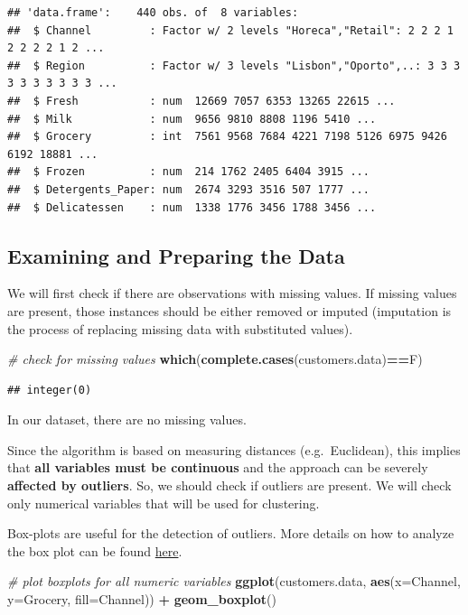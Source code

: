 \documentclass[]{article}
\newenvironment{Shaded}{\begin{snugshade}}{\end{snugshade}}
\newcommand{\KeywordTok}[1]{\textcolor[rgb]{0.13,0.29,0.53}{\textbf{#1}}}
\newcommand{\DataTypeTok}[1]{\textcolor[rgb]{0.13,0.29,0.53}{#1}}
\newcommand{\StringTok}[1]{\textcolor[rgb]{0.31,0.60,0.02}{#1}}
\newcommand{\CommentTok}[1]{\textcolor[rgb]{0.56,0.35,0.01}{\textit{#1}}}
\newcommand{\OperatorTok}[1]{\textcolor[rgb]{0.81,0.36,0.00}{\textbf{#1}}}
\newcommand{\NormalTok}[1]{#1}
\begin{document}
\begin{verbatim}
## 'data.frame':    440 obs. of  8 variables:
##  $ Channel         : Factor w/ 2 levels "Horeca","Retail": 2 2 2 1 2 2 2 2 1 2 ...
##  $ Region          : Factor w/ 3 levels "Lisbon","Oporto",..: 3 3 3 3 3 3 3 3 3 3 ...
##  $ Fresh           : num  12669 7057 6353 13265 22615 ...
##  $ Milk            : num  9656 9810 8808 1196 5410 ...
##  $ Grocery         : int  7561 9568 7684 4221 7198 5126 6975 9426 6192 18881 ...
##  $ Frozen          : num  214 1762 2405 6404 3915 ...
##  $ Detergents_Paper: num  2674 3293 3516 507 1777 ...
##  $ Delicatessen    : num  1338 1776 3456 1788 3456 ...
\end{verbatim}

\subsection{Examining and Preparing the
Data}\label{examining-and-preparing-the-data}

We will first check if there are observations with missing values. If
missing values are present, those instances should be either removed or
imputed (imputation is the process of replacing missing data with
substituted values).

\begin{Shaded}
\begin{Highlighting}[]
\CommentTok{# check for missing values}
\KeywordTok{which}\NormalTok{(}\KeywordTok{complete.cases}\NormalTok{(customers.data)}\OperatorTok{==}\NormalTok{F)}
\end{Highlighting}
\end{Shaded}

\begin{verbatim}
## integer(0)
\end{verbatim}

In our dataset, there are no missing values.

Since the algorithm is based on measuring distances (e.g.~Euclidean),
this implies that \textbf{all variables must be continuous} and the
approach can be severely \textbf{affected by outliers}. So, we should
check if outliers are present. We will check only numerical variables
that will be used for clustering.

Box-plots are useful for the detection of outliers. More details on how
to analyze the box plot can be found
\href{https://flowingdata.com/2008/02/15/how-to-read-and-use-a-box-and-whisker-plot/}{here}.

\begin{Shaded}
\begin{Highlighting}[]
\CommentTok{# plot boxplots for all numeric variables}
\KeywordTok{ggplot}\NormalTok{(customers.data, }\KeywordTok{aes}\NormalTok{(}\DataTypeTok{x=}\NormalTok{Channel, }\DataTypeTok{y=}\NormalTok{Grocery, }\DataTypeTok{fill=}\NormalTok{Channel)) }\OperatorTok{+}\StringTok{ }\KeywordTok{geom_boxplot}\NormalTok{()}
\end{Highlighting}
\end{Shaded}
\end{document}
